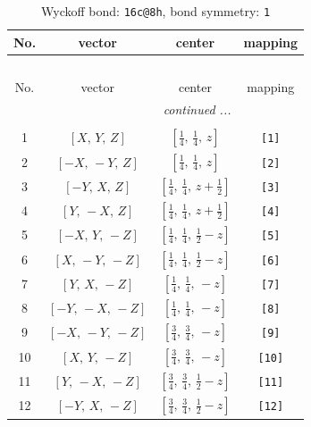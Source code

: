 \documentclass[fleqn,8pt]{jsarticle}
\begin{document}
\begin{longtable}{cccc}
\caption{Wyckoff bond: {\tt 16c@8h}, bond symmetry: {\tt 1}}
 \\
 \hline \hline
No. & vector & center & mapping \\ \hline \endfirsthead

\multicolumn{3}{l}{\tablename\ \thetable{}} \\
 \hline \hline
No. & vector & center & mapping \\ \hline \endhead

 \hline \hline
\multicolumn{3}{r}{\footnotesize\it continued ...} \\ \endfoot

 \hline \hline
\multicolumn{3}{r}{} \\ \endlastfoot

1 & $\left[ X,\, Y,\, Z \right]$ & $\left[ \frac{1}{4},\, \frac{1}{4},\, z \right]$ & {\tt [1]} \\ \hline
2 & $\left[ - X,\, - Y,\, Z \right]$ & $\left[ \frac{1}{4},\, \frac{1}{4},\, z \right]$ & {\tt [2]} \\ \hline
3 & $\left[ - Y,\, X,\, Z \right]$ & $\left[ \frac{1}{4},\, \frac{1}{4},\, z + \frac{1}{2} \right]$ & {\tt [3]} \\ \hline
4 & $\left[ Y,\, - X,\, Z \right]$ & $\left[ \frac{1}{4},\, \frac{1}{4},\, z + \frac{1}{2} \right]$ & {\tt [4]} \\ \hline
5 & $\left[ - X,\, Y,\, - Z \right]$ & $\left[ \frac{1}{4},\, \frac{1}{4},\, \frac{1}{2} - z \right]$ & {\tt [5]} \\ \hline
6 & $\left[ X,\, - Y,\, - Z \right]$ & $\left[ \frac{1}{4},\, \frac{1}{4},\, \frac{1}{2} - z \right]$ & {\tt [6]} \\ \hline
7 & $\left[ Y,\, X,\, - Z \right]$ & $\left[ \frac{1}{4},\, \frac{1}{4},\, - z \right]$ & {\tt [7]} \\ \hline
8 & $\left[ - Y,\, - X,\, - Z \right]$ & $\left[ \frac{1}{4},\, \frac{1}{4},\, - z \right]$ & {\tt [8]} \\ \hline
9 & $\left[ - X,\, - Y,\, - Z \right]$ & $\left[ \frac{3}{4},\, \frac{3}{4},\, - z \right]$ & {\tt [9]} \\ \hline
10 & $\left[ X,\, Y,\, - Z \right]$ & $\left[ \frac{3}{4},\, \frac{3}{4},\, - z \right]$ & {\tt [10]} \\ \hline
11 & $\left[ Y,\, - X,\, - Z \right]$ & $\left[ \frac{3}{4},\, \frac{3}{4},\, \frac{1}{2} - z \right]$ & {\tt [11]} \\ \hline
12 & $\left[ - Y,\, X,\, - Z \right]$ & $\left[ \frac{3}{4},\, \frac{3}{4},\, \frac{1}{2} - z \right]$ & {\tt [12]} \\ \hline

\end{longtable}
\end{document}

